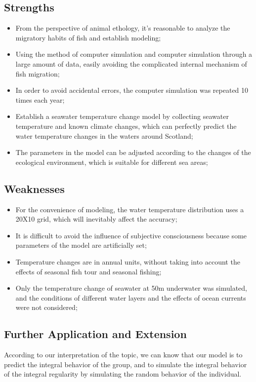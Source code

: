 \documentclass{mcmthesis}
\numberwithin{figure}{section}
\numberwithin{table}{section}
\begin{document}
\subsection{Strengths}

\begin{itemize}
  \item From the perspective of animal ethology, it's reasonable to analyze the migratory habits of fish and establish modeling;
  \item Using the method of computer simulation and computer simulation through a large amount of data, easily avoiding the complicated internal mechanism of fish migration;
  \item In order to avoid accidental errors, the computer simulation was repeated 10 times each year;
  \item Establish a seawater temperature change model by collecting seawater temperature and known climate changes, which can perfectly predict the water temperature changes in the waters around Scotland;
  \item The parameters in the model can be adjusted according to the changes of the ecological environment, which is suitable for different sea areas;
\end{itemize}

\subsection{Weaknesses}
\begin{itemize}
  \item For the convenience of modeling, the water temperature distribution uses a 20X10 grid, which will inevitably affect the accuracy;
  \item It is difficult to avoid the influence of subjective consciousness because some parameters of the model are artificially set;
  \item Temperature changes are in annual units, without taking into account the effects of seasonal fish tour and seasonal fishing;
  \item Only the temperature change of seawater at 50m underwater was simulated, and the conditions of different water layers and the effects of ocean currents were not considered;
\end{itemize}

\subsection{Further Application and Extension}
According to our interpretation of the topic, we can know that our model is to predict the integral behavior of the group, and to simulate the integral behavior of the integral regularity by simulating the random behavior of the individual.
\end{document}
